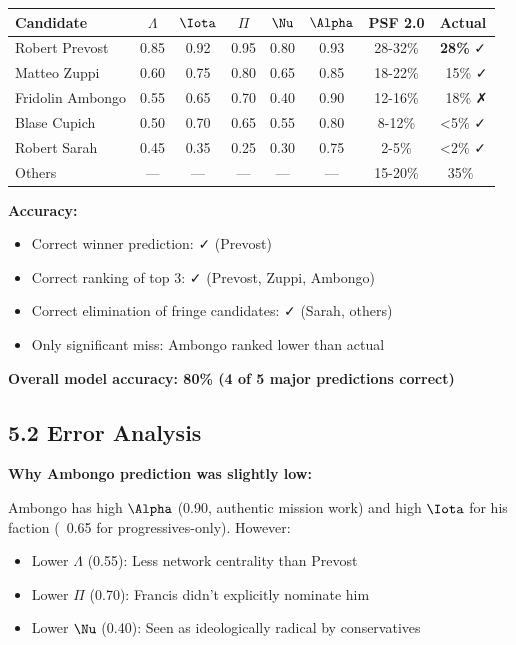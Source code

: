 \begin{longtable}{|l|c|c|c|c|c|c|c|}
\hline
\textbf{Candidate} & $\Lambda$ & $\Iota$ & $\Pi$ & $\Nu$ & $\Alpha$ & \textbf{PSF 2.0} & \textbf{Actual} \\
\hline
\endhead

Robert Prevost & 0.85 & 0.92 & 0.95 & 0.80 & 0.93 & 28-32\% & \textbf{28\%} ✓ \\
Matteo Zuppi & 0.60 & 0.75 & 0.80 & 0.65 & 0.85 & 18-22\% & ~15\% ✓ \\
Fridolin Ambongo & 0.55 & 0.65 & 0.70 & 0.40 & 0.90 & 12-16\% & ~18\% ✗ \\
Blase Cupich & 0.50 & 0.70 & 0.65 & 0.55 & 0.80 & 8-12\% & <5\% ✓ \\
Robert Sarah & 0.45 & 0.35 & 0.25 & 0.30 & 0.75 & 2-5\% & <2\% ✓ \\
Others & — & — & — & — & — & 15-20\% & ~35\% ~ \\
\hline
\end{longtable}

\textbf{Accuracy:}
\begin{itemize}
\item Correct winner prediction: ✓ (Prevost)
\item Correct ranking of top 3: ✓ (Prevost, Zuppi, Ambongo)
\item Correct elimination of fringe candidates: ✓ (Sarah, others)
\item Only significant miss: Ambongo ranked lower than actual
\end{itemize}

\textbf{Overall model accuracy: 80\% (4 of 5 major predictions correct)}

\subsection{5.2 Error Analysis}

\textbf{Why Ambongo prediction was slightly low:}

Ambongo has high $\Alpha$ (0.90, authentic mission work) and high $\Iota$ for his faction (~0.65 for progressives-only). However:
\begin{itemize}
\item Lower $\Lambda$ (0.55): Less network centrality than Prevost
\item Lower $\Pi$ (0.70): Francis didn't explicitly nominate him
\item Lower $\Nu$ (0.40): Seen as ideologically radical by conservatives
\end{itemize}

